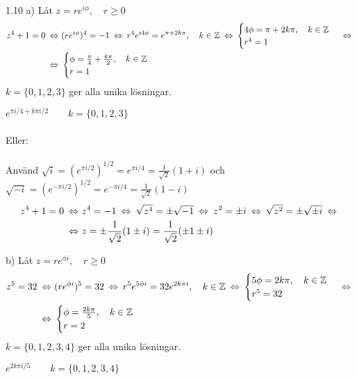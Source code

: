 \begin{task}{1.10 a)}
	Låt $z=re^{i\phi}, \quad r \ge 0$
	\begin{align*}
		z^4+1=0 \lra 
		&(re^{i\phi})^4=-1 \lra
		r^4e^{i4\phi}=e^{\pi+2k\pi}, \quad k\in\mathbb{Z} \lra
		\begin{cases}
		4\phi=\pi+2k\pi\cond{k\inset{Z}} \\
		r^4=1
		\end{cases} \lra \\ \lra
		&\begin{cases}
		\phi=\frac{\pi}{4}+\frac{k\pi}{2}\cond{k\inset{Z}} \\
		r=1
		\end{cases}
	\end{align*}
	$k=\{0,1,2,3\}$ ger alla unika lösningar.
	
	\ans $e^{\pi i/4+k\pi i/2} \qquad k=\{0,1,2,3\}$
	\\ \\
	Eller:
	\\ \\
	Använd $\sqrt{i}=(e^{\pi i/2})^{1/2}=e^{\pi i/4}=\frac{1}{\sqrt{2}}(1+i)$ och $\sqrt{-i}=(e^{-\pi i/2})^{1/2}=e^{-\pi i/4}=\frac{1}{\sqrt{2}}(1-i)$
	\begin{align*}
	z^4+1=0 \lra 
	&z^4=-1 \lra
	\sqrt{z^4}=\pm\sqrt{-1} \lra
	z^2=\pm i \lra
	\sqrt{z^2}=\pm\sqrt{\pm i} \lra \\ \lra
	&z=\pm\frac{1}{\sqrt{2}}(1\pm i)=\frac{1}{\sqrt{2}}(\pm 1\pm i)
	\end{align*}
\end{task}

\begin{task}{b)}
	Låt $z=re^{\phi i}, \quad r \ge 0$
	\begin{align*}
		z^5=32 \lra
		&(re^{\phi i})^5=32 \lra
		r^5e^{5\phi i}=32e^{2k\pi i}\cond{k\inset{Z}} \lra
		\begin{cases}
		5\phi=2k\pi, \quad k\in\mathbb{Z} \\
		r^5=32
		\end{cases} \lra \\ \lra
		&\begin{cases}
		\phi=\frac{2k\pi}{5}\cond{k\inset{Z}} \\
		r=2
		\end{cases}
	\end{align*}
	$k=\{0,1,2,3,4\}$ ger alla unika lösningar.
	
	\ans $e^{2k\pi i/5} \qquad k=\{0,1,2,3,4\}$
\end{task}

